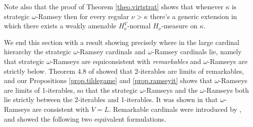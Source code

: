 \documentclass[../../main]{subfiles}
\begin{document}
Note also that the proof of Theorem \ref{theo.virtstrat} shows that whenever $\kappa$ is strategic $\omega$-Ramsey then for every regular $\nu>\kappa$ there's a generic extension in which there exists a weakly amenable $H_\nu^V$-normal $H_\nu$-measure on $\kappa$.

\qquad We end this section with a result showing precisely where in the large cardinal hierarchy the strategic $\omega$-Ramsey cardinals and $\omega$-Ramsey cardinals lie, namely that strategic $\omega$-Ramseys are equiconsistent with \textit{remarkables} and $\omega$-Ramseys are strictly below. Theorem 4.8 of \cite{Ramsey2} showed that 2-iterables are limits of remarkables, and our Propositions \ref{prop.tildegame} and \ref{prop.ramseyit} shows that $\omega$-Ramseys are limits of 1-iterables, so that the strategic $\omega$-Ramseys and the $\omega$-Ramseys both lie strictly between the 2-iterables and 1-iterables. It was shown in \cite{HolySchlicht} that $\omega$-Ramseys are consistent with $V=L$. Remarkable cardinals were introduced by \cite{remarkable}, and \cite{GitmanSchindler} showed the following two equivalent formulations.

\end{document}
